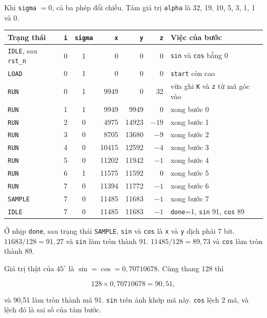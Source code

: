 \documentclass[12pt,a4paper]{article}
\begin{document}
Khi \texttt{sigma} \(= 0\), cả ba phép đổi chiều. Tám giá trị \texttt{alpha} là 32, 19, 10, 5, 3, 1, 1 và 0.

\begin{center}
\scriptsize
\begin{tabular}{|l|c|c|r|r|r|l|}
\hline
Trạng thái & \texttt{i} & \texttt{sigma} & \texttt{x} & \texttt{y} & \texttt{z} & Việc của bước \\ \hline
\texttt{IDLE}, sau \texttt{rst\_n} & 0 & 1 & 0 & 0 & 0 & \texttt{sin} và \texttt{cos} bằng 0 \\ \hline
\texttt{LOAD} & 0 & 1 & 0 & 0 & 0 & \texttt{start} còn cao \\ \hline
\texttt{RUN} & 0 & 1 & 9949 & 0 & 32 & vừa ghi \texttt{K} và \texttt{z} từ mã góc vào \\ \hline
\texttt{RUN} & 1 & 1 & 9949 & 9949 & 0 & xong bước 0 \\ \hline
\texttt{RUN} & 2 & 0 & 4975 & 14923 & $-19$ & xong bước 1 \\ \hline
\texttt{RUN} & 3 & 0 & 8705 & 13680 & $-9$ & xong bước 2 \\ \hline
\texttt{RUN} & 4 & 0 & 10415 & 12592 & $-4$ & xong bước 3 \\ \hline
\texttt{RUN} & 5 & 0 & 11202 & 11942 & $-1$ & xong bước 4 \\ \hline
\texttt{RUN} & 6 & 1 & 11575 & 11592 & 0 & xong bước 5 \\ \hline
\texttt{RUN} & 7 & 0 & 11394 & 11772 & $-1$ & xong bước 6 \\ \hline
\texttt{SAMPLE} & 7 & 0 & 11485 & 11683 & $-1$ & xong bước 7 \\ \hline
\texttt{IDLE} & 7 & 0 & 11485 & 11683 & $-1$ & \texttt{done}=1, \texttt{sin} 91, \texttt{cos} 89 \\ \hline
\end{tabular}
\end{center}

Ở nhịp \texttt{done}, sau trạng thái \texttt{SAMPLE}, \texttt{sin} và \texttt{cos} là \texttt{x} và \texttt{y} dịch phải 7 bit. \(11683 / 128 = 91{,}27\) và \texttt{sin} làm tròn thành 91. \(11485 / 128 = 89{,}73\) và \texttt{cos} làm tròn thành 89.

Giá trị thật của \(45^\circ\) là \(\sin = \cos = 0{,}70710678\). Cùng thang 128 thì

\[
128 \times 0{,}70710678 = 90{,}51,
\]

và 90{,}51 làm tròn thành mã 91. \texttt{sin} trên ảnh khớp mã này. \texttt{cos} lệch 2 mã, và lệch đó là sai số của tám bước.
\end{document}
